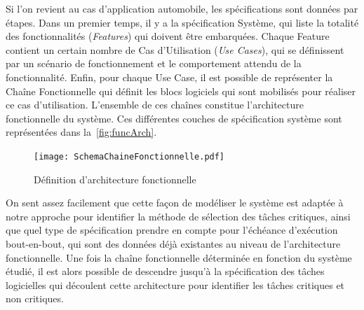 \documentclass[french, a4paper, 11pt, twoside, pdftex]{StyleThese}
\begin{document}
		Si l'on revient au cas d'application automobile, les spécifications sont données par étapes. Dans un premier temps, il y a la spécification Système, qui liste la totalité des fonctionnalités (\emph{Features}) qui doivent être embarquées. Chaque Feature contient un certain nombre de Cas d'Utilisation (\emph{Use Cases}), qui se définissent par un scénario de fonctionnement et le comportement attendu de la fonctionnalité. Enfin, pour chaque Use Case, il est possible de représenter la Chaîne Fonctionnelle qui définit les blocs logiciels qui sont mobilisés pour réaliser ce cas d'utilisation. L'ensemble de ces chaînes constitue l'architecture fonctionnelle du système. Ces différentes couches de spécification système sont représentées dans la~\autoref{fig:funcArch}. %
		
		\begin{figure}[ht]
			\centering
			\texttt{[image: SchemaChaineFonctionnelle.pdf]}
			\caption{Définition d'architecture fonctionnelle}
			\label{fig:funcArch}
		\end{figure}
	
		On sent assez facilement que cette façon de modéliser le système est adaptée à notre approche pour identifier la méthode de sélection des tâches critiques, ainsi que quel type de spécification prendre en compte pour l'échéance d'exécution bout-en-bout, qui sont des données déjà existantes au niveau de l'architecture fonctionnelle. Une fois la chaîne fonctionnelle déterminée en fonction du système étudié, il est alors possible de descendre jusqu'à la spécification des tâches logicielles qui découlent cette architecture pour identifier les tâches critiques et non critiques.
		
\end{document}
